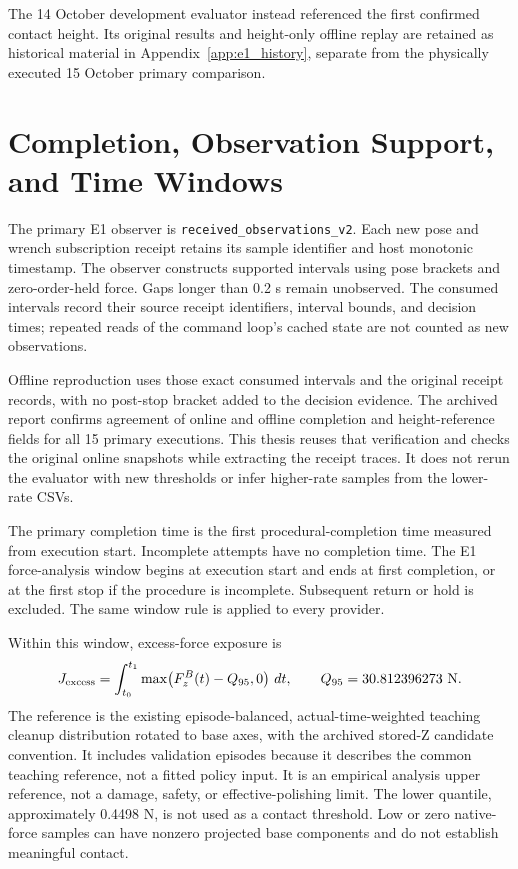 The 14 October development evaluator instead referenced the first confirmed contact height. Its original results and height-only offline replay are retained as historical material in Appendix~\ref{app:e1_history}, separate from the physically executed 15 October primary comparison.

\section{Completion, Observation Support, and Time Windows}
The primary E1 observer is \texttt{received\_observations\_v2}. Each new pose and wrench subscription receipt retains its sample identifier and host monotonic timestamp. The observer constructs supported intervals using pose brackets and zero-order-held force. Gaps longer than 0.2 s remain unobserved. The consumed intervals record their source receipt identifiers, interval bounds, and decision times; repeated reads of the command loop's cached state are not counted as new observations.

Offline reproduction uses those exact consumed intervals and the original receipt records, with no post-stop bracket added to the decision evidence. The archived report confirms agreement of online and offline completion and height-reference fields for all 15 primary executions. This thesis reuses that verification and checks the original online snapshots while extracting the receipt traces. It does not rerun the evaluator with new thresholds or infer higher-rate samples from the lower-rate CSVs.

The primary completion time is the first procedural-completion time measured from execution start. Incomplete attempts have no completion time. The E1 force-analysis window begins at execution start and ends at first completion, or at the first stop if the procedure is incomplete. Subsequent return or hold is excluded. The same window rule is applied to every provider.

Within this window, excess-force exposure is
\begin{equation}
 J_{\mathrm{excess}}=\int_{t_0}^{t_1}
 \max\!\left(F_z^B(t)-Q_{95},0\right)\,dt,
 \qquad Q_{95}=30.812396273\ \mathrm{N}.
 \label{eq:excess_force}
\end{equation}
The reference is the existing episode-balanced, actual-time-weighted teaching cleanup distribution rotated to base axes, with the archived stored-Z candidate convention. It includes validation episodes because it describes the common teaching reference, not a fitted policy input. It is an empirical analysis upper reference, not a damage, safety, or effective-polishing limit. The lower quantile, approximately 0.4498 N, is not used as a contact threshold. Low or zero native-force samples can have nonzero projected base components and do not establish meaningful contact.

